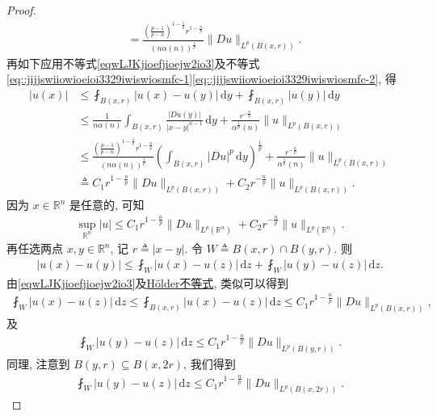 \documentclass[../../main.tex]{subfiles}
\begin{document}
\begin{proof}
\begin{align}
&= \frac{\left(\frac{p-1}{p-n}\right)^{1-\frac{1}{p}} r^{1-\frac{n}{p}}}{(n\alpha(n))^{\frac{1}{p}}} \|Du\|_{L^p(B(x,r))}.\label{eq::jijjswiiowioeioi3329iwiswiosmfc-2}
\end{align}
再如下应用不等式\eqref{eqwLJKjioefjioejw2io3}及不等式\eqref{eq::jijjswiiowioeioi3329iwiswiosmfc-1}\eqref{eq::jijjswiiowioeioi3329iwiswiosmfc-2}, 得
\begin{align*}
|u(x)| &\leqslant \fint_{B(x,r)} |u(x)-u(y)|\,\mathrm{d}y + \fint_{B(x,r)} |u(y)|\,\mathrm{d}y \\
&\leqslant \frac{1}{n\alpha(n)} \int_{B(x,r)} \frac{|Du(y)|}{|x-y|^{n-1}}\,\mathrm{d}y + \frac{r^{-\frac{n}{p}}}{\alpha^{\frac{1}{p}}(n)} \|u\|_{L^p(B(x,r))} \\
&\leqslant \frac{\left(\frac{p-1}{p-n}\right)^{1-\frac{1}{p}} r^{1-\frac{n}{p}}}{(n\alpha(n))^{\frac{1}{p}}} \left(\int_{B(x,r)} |Du|^p\,\mathrm{d}y\right)^{\frac{1}{p}} + \frac{r^{-\frac{n}{p}}}{\alpha^{\frac{1}{p}}(n)} \|u\|_{L^p(B(x,r))} \\
&\triangleq C_1 r^{1-\frac{n}{p}} \|Du\|_{L^p(B(x,r))} + C_2 r^{-\frac{n}{p}} \|u\|_{L^p(B(x,r))}.
\end{align*}
因为 $x\in\mathbb{R}^n$ 是任意的, 可知
\begin{align}
\sup\limits_{\mathbb{R}^n} |u| \leqslant C_1 r^{1-\frac{n}{p}} \|Du\|_{L^p(\mathbb{R}^n)} + C_2 r^{-\frac{n}{p}} \|u\|_{L^p(\mathbb{R}^n)}. \label{eq:ch05-morrey-23}
\end{align}
再任选两点 $x,y\in\mathbb{R}^n$, 记 $r \triangleq |x-y|$. 令 $W \triangleq B(x,r)\cap B(y,r)$. 则
\begin{align}
|u(x)-u(y)| \leqslant \fint_W |u(x)-u(z)|\,\mathrm{d}z + \fint_W |u(y)-u(z)|\,\mathrm{d}z. \label{eq:ch05-morrey-24}
\end{align}
由\eqref{eqwLJKjioefjioejw2io3}及\hyperref[Real Analysis-theorem:实变函数--Hölder不等式]{Hölder不等式}, 类似可以得到
\begin{align}
\fint_W |u(x)-u(z)|\,\mathrm{d}z \leqslant \fint_{B(x,r)} |u(x)-u(z)|\,\mathrm{d}z \leqslant C_1 r^{1-\frac{n}{p}} \|Du\|_{L^p(B(x,r))}, \label{eq:ch05-morrey-25}
\end{align}
及
\begin{align*}
\fint_W |u(y)-u(z)|\,\mathrm{d}z \leqslant C_1 r^{1-\frac{n}{p}} \|Du\|_{L^p(B(y,r))}.
\end{align*}
同理, 注意到 $B(y,r)\subseteq B(x,2r)$, 我们得到
\begin{align*}
\fint_W |u(y)-u(z)|\,\mathrm{d}z \leqslant C_1 r^{1-\frac{n}{p}} \|Du\|_{L^p(B(x,2r))}.

\end{align*}
\end{proof}
\end{document}
